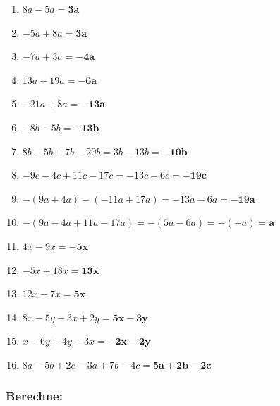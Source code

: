 \documentclass[a4paper,10pt]{article} %
\begin{document}
\begin{enumerate}[label=\alph*)]

  \item \(8a - 5a =
    \mathbf{3a}\) %

  \item \(-5a + 8a =
    \mathbf{3a}\) %

  \item \(-7a + 3a =
    \mathbf{-4a}\) %

  \item \(13a - 19a =
    \mathbf{-6a}\) %

  \item \(-21a + 8a =
    \mathbf{-13a}\) %

  \item \(-8b - 5b =
    \mathbf{-13b}\) %

  \item \(8b - 5b + 7b - 20b =
    3b - 13b =
    \mathbf{-10b}\) %

  \item \(-9c - 4c + 11c - 17c =
    -13c - 6c =
    \mathbf{-19c}\) %

  \item \(-(9a + 4a) - (-11a + 17a) =
    -13a - 6a =
    \mathbf{-19a}\) %

  \item \(-(9a - 4a + 11a - 17a) =
    -(5a - 6a) = -(-a) =
    \mathbf{a}\) %

  \item \(4x - 9x =
    \mathbf{-5x}\) %

  \item \(-5x + 18x =
    \mathbf{13x}\) %

  \item \(12x - 7x =
    \mathbf{5x}\) %

  \item \(8x - 5y - 3x + 2y =
    \mathbf{5x - 3y}\) %

  \item \(x - 6y + 4y - 3x =
    \mathbf{-2x - 2y}\) %

  \item \(8a - 5b + 2c - 3a + 7b - 4c =
    \mathbf{5a + 2b - 2c}\) %

\end{enumerate}

\subsubsection{Berechne:} %
\end{document}
